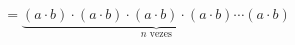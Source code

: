 \documentclass[preview]{standalone}
\begin{document}
\begin{align*}
= \underbrace{(a\cdot b) \cdot (a\cdot b) \cdot (a\cdot b) \cdot (a\cdot b) \cdots (a\cdot b) }_{n \text{ vezes}}
\end{align*}
\end{document}
